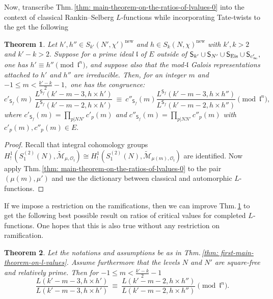\documentclass[11pt]{amsart}
\newtheorem{theorem}{Theorem}[section]
\begin{document}
Now, transcribe Thm.\,\ref{thm: main-theorem-on-the-ratios-of-lvalues-0} into the context of classical Rankin--Selberg $L$-functions while incorporating 
Tate-twists to the get the following



\begin{theorem}
\label{thm:reg-sem-poly}
	Let $h',h'' \in S_{k'}(N',\chi')^{\text{new}}$ and $h \in S_k(N,\chi)^{\text{new}}$ with $k',k > 2$ and $k'-k > 2.$  
	Suppose for a prime ideal $\mathfrak{l}$ of $E$ outside of 
$\mathsf{S}_{k'} \cup \mathsf{S}_{N'} \cup \mathsf{S}_{\textup{Eis}} \cup \mathsf{S}_{c'_\infty},$ one has  
$h' \equiv h'' \pmod{\mathfrak{l}^n}$, and suppose also that 
	the mod-$\mathfrak{l}$ Galois representations attached to $h' $ and $h''$ are irreducible. Then,
	 for an integer $m$ and $-1\leq m < \frac{k'-k}{2} - 1,$ one has the congruence:
	\begin{equation}
	\label{eqn:reg-sem-poly}
		c'_{\mathsf{S}_f}(m)\, \frac{L^{\mathsf{S}_f}(k'-m-3, h\times h' )}{L^{\mathsf{S}_f}(k'-m-2, h\times h' )} \ \equiv \ 
		c''_{\mathsf{S}_f}(m)\frac{L^{\mathsf{S}_f}(k'-m-3, h\times h'' )}{L^{\mathsf{S}_f}(k'-m-2, h\times h'')}  \pmod{\mathfrak{l}^n}, 
	\end{equation} 
	where $c'_{\mathsf{S}_f}(m) = \prod_{p |NN'} c'_p(m)$ and $c''_{\mathsf{S}_f}(m) = \prod_{p |NN'} c''_p(m)$ with $c'_p(m),c''_p(m) \in E.$	\label{thm: first-main-theorem-on-l-values}
\end{theorem}



\begin{proof}
Recall that integral cohomology groups
${H}^1_!(S^{(2)}_1(N), \mathcal{\widetilde{\mathcal{M}}}_{\mu,\mathcal{O}_\mathfrak{l}}) \cong 
{H}^1_!(S^{(2)}_1(N), \mathcal{\widetilde{\mathcal{M}}}_{\mu(m),\mathcal{O}_\mathfrak{l}})$ are identified. 
Now apply Thm.\,\ref{thm: main-theorem-on-the-ratios-of-lvalues-0} to the pair $(\mu(m), \mu')$ and 
use the dictionary between classical and automorphic $L$-functions.
\end{proof}


If we impose a restriction on the ramifications, then we can improve 
Thm.\,\ref{thm:reg-sem-poly} to get the following best possible result on ratios of critical values for completed $L$-functions. 
One hopes that this is also true without any restriction on ramification. 

\medskip
\begin{theorem} 
\label{thm: second-main-theorem-on-l-values}
Let the notations and assumptions be as in Thm.\,\ref{thm: first-main-theorem-on-l-values}. 
Assume furthermore that the levels $N$ and $N'$ are square-free and relatively prime. Then for $-1\leq m < \frac{k'-k}{2} - 1$ 
	\begin{equation}
	\label{eqn:best-possible-cong}
		\frac{L(k'-m-3, h\times h' )}{L(k'-m-3, h\times h' )} \ \equiv \  
		\frac{L(k'-m-2, h\times h'' )}{L(k'-m-2, h\times h'')} \pmod{\mathfrak{l}^n}.
	\end{equation} 	
\end{theorem}
\end{document}
